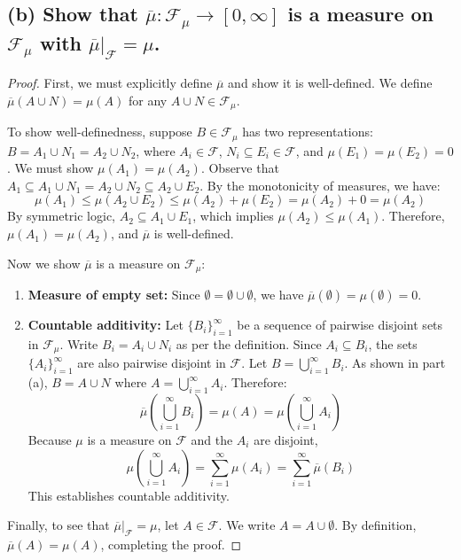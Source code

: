 \documentclass[12pt]{article}
\begin{document}
\subsection*{(b) Show that $\overline{\mu}: \mathcal{F}_{\mu} \rightarrow [0, \infty]$ is a measure on $\mathcal{F}_{\mu}$ with $\overline{\mu}|_{\mathcal{F}} = \mu$.}

\begin{proof}
First, we must explicitly define $\overline{\mu}$ and show it is well-defined. We define $\overline{\mu}(A \cup N) = \mu(A)$ for any $A \cup N \in \mathcal{F}_{\mu}$. 

To show well-definedness, suppose $B \in \mathcal{F}_{\mu}$ has two representations: $B = A_1 \cup N_1 = A_2 \cup N_2$, where $A_i \in \mathcal{F}$, $N_i \subseteq E_i \in \mathcal{F}$, and $\mu(E_1) = \mu(E_2) = 0$. We must show $\mu(A_1) = \mu(A_2)$.
Observe that $A_1 \subseteq A_1 \cup N_1 = A_2 \cup N_2 \subseteq A_2 \cup E_2$. 
By the monotonicity of measures, we have:
$$ \mu(A_1) \le \mu(A_2 \cup E_2) \le \mu(A_2) + \mu(E_2) = \mu(A_2) + 0 = \mu(A_2) $$
By symmetric logic, $A_2 \subseteq A_1 \cup E_1$, which implies $\mu(A_2) \le \mu(A_1)$. Therefore, $\mu(A_1) = \mu(A_2)$, and $\overline{\mu}$ is well-defined.

Now we show $\overline{\mu}$ is a measure on $\mathcal{F}_{\mu}$:
\begin{enumerate}
    \item \textbf{Measure of empty set:} Since $\emptyset = \emptyset \cup \emptyset$, we have $\overline{\mu}(\emptyset) = \mu(\emptyset) = 0$.
    \item \textbf{Countable additivity:} Let $\{B_i\}_{i=1}^{\infty}$ be a sequence of pairwise disjoint sets in $\mathcal{F}_{\mu}$. Write $B_i = A_i \cup N_i$ as per the definition. Since $A_i \subseteq B_i$, the sets $\{A_i\}_{i=1}^{\infty}$ are also pairwise disjoint in $\mathcal{F}$. Let $B = \bigcup_{i=1}^{\infty} B_i$. As shown in part (a), $B = A \cup N$ where $A = \bigcup_{i=1}^{\infty} A_i$. Therefore:
    $$ \overline{\mu}\left(\bigcup_{i=1}^{\infty} B_i\right) = \mu(A) = \mu\left(\bigcup_{i=1}^{\infty} A_i\right) $$
    Because $\mu$ is a measure on $\mathcal{F}$ and the $A_i$ are disjoint,
    $$ \mu\left(\bigcup_{i=1}^{\infty} A_i\right) = \sum_{i=1}^{\infty} \mu(A_i) = \sum_{i=1}^{\infty} \overline{\mu}(B_i) $$
    This establishes countable additivity.
\end{enumerate}
Finally, to see that $\overline{\mu}|_{\mathcal{F}} = \mu$, let $A \in \mathcal{F}$. We write $A = A \cup \emptyset$. By definition, $\overline{\mu}(A) = \mu(A)$, completing the proof.
\end{proof}
\end{document}
